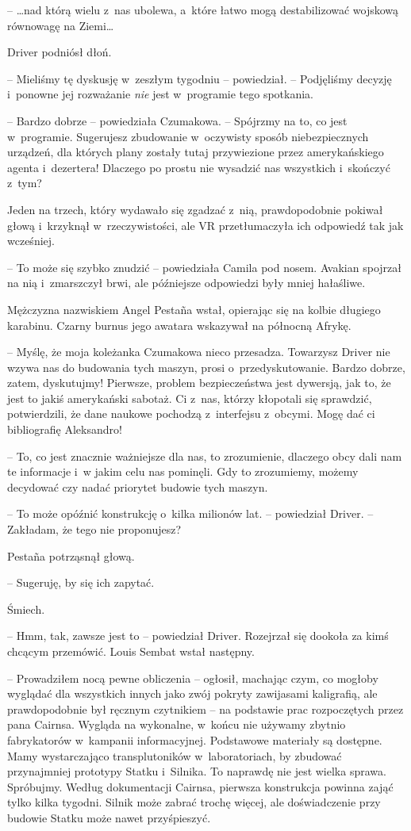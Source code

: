 \documentclass[oneside,polish,12pt,sfheadings]{mwbk}
\begin{document}
-- \ldots nad którą wielu z~nas ubolewa, a~które łatwo mogą destabilizować
wojskową równowagę na Ziemi\ldots

Driver podniósł dłoń.

-- Mieliśmy tę dyskusję w~zeszłym tygodniu -- powiedział. -- Podjęliśmy
decyzję i~ponowne jej rozważanie \emph{nie} jest w~programie tego
spotkania.

-- Bardzo dobrze -- powiedziała Czumakowa. -- Spójrzmy na to, co jest w~programie. Sugerujesz zbudowanie w~oczywisty sposób niebezpiecznych
urządzeń, dla których plany zostały tutaj przywiezione przez
amerykańskiego agenta i~dezertera! Dlaczego po prostu nie wysadzić nas
wszystkich i~skończyć z~tym?

Jeden na trzech, który wydawało się zgadzać z~nią, prawdopodobnie
pokiwał głową i~krzyknął w~rzeczywistości, ale VR przetłumaczyła ich
odpowiedź tak jak wcześniej.

-- To może się szybko znudzić -- powiedziała Camila pod nosem. Avakian
spojrzał na nią i~zmarszczył brwi, ale późniejsze odpowiedzi były mniej
hałaśliwe.

Mężczyzna nazwiskiem Angel Pestaña wstał, opierając się na kolbie
długiego karabinu. Czarny burnus jego awatara wskazywał na północną
Afrykę.

-- Myślę, że moja koleżanka Czumakowa nieco przesadza. Towarzysz Driver
nie wzywa nas do budowania tych maszyn, prosi o~przedyskutowanie. Bardzo
dobrze, zatem, dyskutujmy! Pierwsze, problem bezpieczeństwa jest
dywersją, jak to, że jest to jakiś amerykański sabotaż. Ci z~nas, którzy
kłopotali się sprawdzić, potwierdzili, że dane naukowe pochodzą z~interfejsu z~obcymi. Mogę dać ci bibliografię Aleksandro!

-- To, co jest znacznie ważniejsze dla nas, to zrozumienie, dlaczego obcy
dali nam te informacje i~w jakim celu nas pominęli. Gdy to zrozumiemy,
możemy decydować czy nadać priorytet budowie tych maszyn.

-- To może opóźnić konstrukcję o~kilka milionów lat. -- powiedział Driver.
-- Zakładam, że tego nie proponujesz?

Pestaña potrząsnął głową. 

-- Sugeruję, by się ich zapytać.

Śmiech.

-- Hmm, tak, zawsze jest to -- powiedział Driver. Rozejrzał się dookoła za
kimś chcącym przemówić. Louis Sembat wstał następny.

-- Prowadziłem nocą pewne obliczenia -- ogłosił, machając czym, co mogłoby
wyglądać dla wszystkich innych jako zwój pokryty zawijasami kaligrafią,
ale prawdopodobnie był ręcznym czytnikiem -- na podstawie prac
rozpoczętych przez pana Cairnsa. Wygląda na wykonalne, w~końcu nie używamy
zbytnio fabrykatorów w~kampanii informacyjnej. Podstawowe materiały są
dostępne. Mamy wystarczająco transplutoników w~laboratoriach, by
zbudować przynajmniej prototypy Statku i~Silnika. To naprawdę nie jest
wielka sprawa. Spróbujmy. Według dokumentacji Cairnsa, pierwsza
konstrukcja powinna zająć tylko kilka tygodni. Silnik może zabrać trochę
więcej, ale doświadczenie przy budowie Statku może nawet przyśpieszyć.
\end{document}
